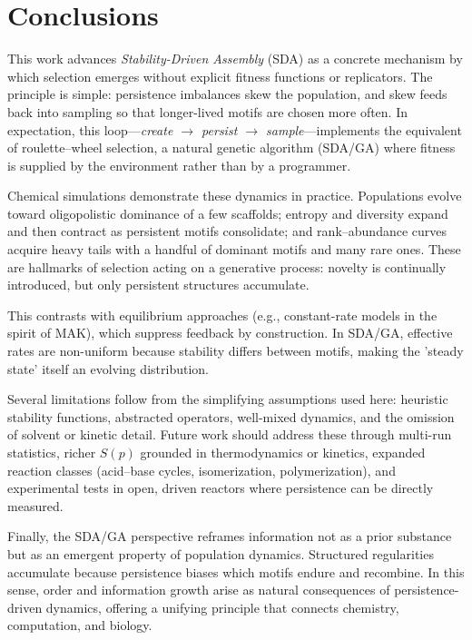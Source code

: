 \documentclass[life,article,submit,pdftex,moreauthors]{Definitions/mdpi}
\begin{document}
\section{Conclusions}

This work advances \textit{Stability-Driven Assembly} (SDA) as a concrete mechanism by which selection emerges without explicit fitness functions or replicators. The principle is simple: persistence imbalances skew the population, and skew feeds back into sampling so that longer-lived motifs are chosen more often. In expectation, this loop—\emph{create $\rightarrow$ persist $\rightarrow$ sample}—implements the equivalent of roulette–wheel selection, a natural genetic algorithm (SDA/GA) where fitness is supplied by the environment rather than by a programmer.  

Chemical simulations demonstrate these dynamics in practice. Populations evolve toward oligopolistic dominance of a few scaffolds; entropy and diversity expand and then contract as persistent motifs consolidate; and rank–abundance curves acquire heavy tails with a handful of dominant motifs and many rare ones. These are hallmarks of selection acting on a generative process: novelty is continually introduced, but only persistent structures accumulate.  

This contrasts with equilibrium approaches (e.g., constant-rate models in the spirit of MAK), which suppress feedback by construction. In SDA/GA, effective rates are non-uniform because stability differs between motifs, making the 'steady state' itself an evolving distribution.  

Several limitations follow from the simplifying assumptions used here: heuristic stability functions, abstracted operators, well-mixed dynamics, and the omission of solvent or kinetic detail. Future work should address these through multi-run statistics, richer $S(p)$ grounded in thermodynamics or kinetics, expanded reaction classes (acid–base cycles, isomerization, polymerization), and experimental tests in open, driven reactors where persistence can be directly measured.  

Finally, the SDA/GA perspective reframes information not as a prior substance but as an emergent property of population dynamics. Structured regularities accumulate because persistence biases which motifs endure and recombine. In this sense, order and information growth arise as natural consequences of persistence-driven dynamics, offering a unifying principle that connects chemistry, computation, and biology.  
\end{document}
